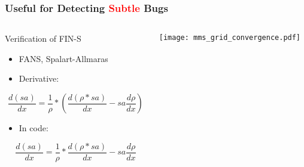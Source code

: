 \documentclass[mathserif]{beamer}
\begin{document}
\begin{frame}
  \frametitle{Useful for Detecting \textcolor{red}{Subtle} Bugs}

  \begin{columns}[c]
    \begin{column}{6cm}

      \begin{block}{Verification of FIN-S}
        \small
        \begin{itemize}
        \item \small FANS, Spalart-Allmaras
          
        \item Derivative:
        \end{itemize}
          \begin{equation}
            \nonumber  
            \frac{d(sa)}{dx} = \frac{1}{\rho}*\left(\frac{d(\rho *sa)}{dx} - sa \frac{d\rho}{dx}\right)
          \end{equation}
          
        \begin{itemize}
        \item In code:
        \end{itemize}

          \begin{equation}
            \nonumber  
            \frac{d(sa)}{dx} = \frac{1}{\rho}*\frac{d(\rho *sa)}{dx} - sa \frac{d \rho}{dx}
          \end{equation}
          
      \end{block}
    \end{column}
   
    \begin{column}{5cm}
      \begin{center}
        \texttt{[image: mms\_grid\_convergence.pdf]} \\
      \end{center}
    \end{column}

    \end{columns}

\end{frame}
\end{document}

